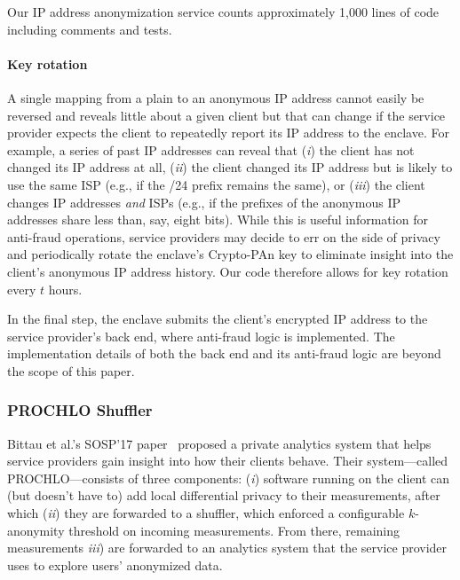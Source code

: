 Our IP address anonymization service counts approximately 1,000 lines of code including comments and tests.


\paragraph{Key rotation}

\cite{Padmanabhan20a}


A single mapping from a plain to an anonymous IP address cannot easily be reversed and reveals little about a given client but that can change if the service provider expects the client to repeatedly report its IP address to the enclave.  For example, a series of past IP addresses can reveal that (\emph{i}) the client has not changed its IP address at all, (\emph{ii}) the client changed its IP address but is likely to use the same ISP (e.g., if the /24 prefix remains the same), or (\emph{iii}) the client changes IP addresses \emph{and} ISPs (e.g., if the prefixes of the anonymous IP addresses share less than, say, eight bits).  While this is useful information for anti-fraud operations, service providers may decide to err on the side of privacy and periodically rotate the enclave's Crypto-PAn key to eliminate insight into the client's anonymous IP address history.  Our code therefore allows for key rotation every $t$ hours.

In the final step, the enclave submits the client's encrypted IP address to the service provider's back end, where anti-fraud logic is implemented.  The implementation details of both the back end and its anti-fraud logic are beyond the scope of this paper.

\subsubsection{PROCHLO Shuffler}
\label{sec:shuffler}

Bittau et al.'s SOSP'17 paper~\cite{Bittau2017a} proposed a private analytics system that helps service providers gain insight into how their clients behave.  Their system---called PROCHLO---consists of three components: (\emph{i}) software running on the client can (but doesn't have to) add local differential privacy to their measurements, after which (\emph{ii}) they are forwarded to a shuffler, which enforced a configurable $k$-anonymity threshold on incoming measurements. From there, remaining measurements \emph{iii}) are forwarded to an analytics system that the service provider uses to explore users' anonymized data.

